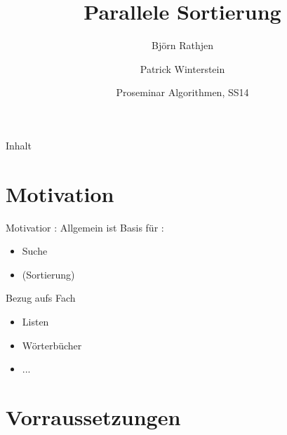 \documentclass[ucs,9pt]{beamer}
\title[|| Sort] %
{Parallele Sortierung}
\author[] %
{Björn Rathjen \and Patrick Winterstein}
\institute[FU Berlin] %
{Freie Universität Berlin}
\date[ProSem Algo]
{Proseminar Algorithmen, SS14}
\begin{document}
\begin{frame}[plain]
  \titlepage
\end{frame}
 
\begin{frame}{Inhalt}
\end{frame}
\section{Motivation}
\begin{frame}{Motivatior : Allgemein}
ist Basis für :
\begin{itemize}
\item Suche
\item (Sortierung)
\end{itemize}
\end{frame}
\begin{frame}{Bezug aufs Fach}
\begin{itemize}
\item Listen
\item Wörterbücher
\item ... 
\end{itemize}
\end{frame}
\section{Vorraussetzungen}
\end{document}
